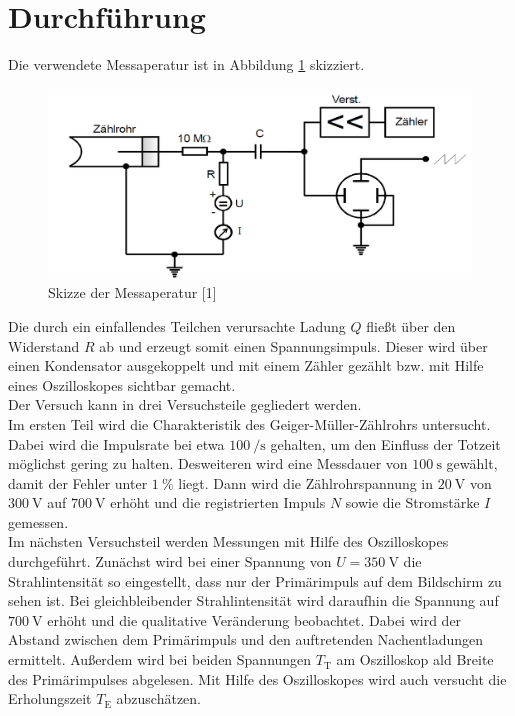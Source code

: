 \section{Durchführung}
\label{sec:Durchführung}

Die verwendete Messaperatur ist in Abbildung \ref{fig:Aufbau} skizziert. 

\begin{figure}
  \centering
  \includegraphics[scale=0.3]{content/Aufbau.png}
  \caption{Skizze der Messaperatur [1]}
  \label{fig:Aufbau}
\end{figure}

Die durch ein einfallendes Teilchen verursachte Ladung $Q$ fließt über den Widerstand $R$
ab und erzeugt somit einen Spannungsimpuls. Dieser wird über einen Kondensator 
ausgekoppelt und mit einem Zähler gezählt bzw. mit Hilfe eines Oszilloskopes sichtbar
gemacht. \\
Der Versuch kann in drei Versuchsteile gegliedert werden. \\

Im ersten Teil wird die Charakteristik des Geiger-Müller-Zählrohrs untersucht. Dabei 
wird die Impulsrate bei etwa $\SI{100}{\per\second}$ gehalten, um den Einfluss der 
Totzeit möglichst gering zu halten. Desweiteren wird eine Messdauer von $\SI{100}{\second}$
gewählt, damit der Fehler unter $\SI{1}{\percent}$ liegt. Dann wird die Zählrohrspannung
in $\SI{20}{\volt}$ von $\SI{300}{\volt}$ auf $\SI{700}{\volt}$ erhöht und die 
registrierten Impuls $N$ sowie die Stromstärke $I$ gemessen. \\

Im nächsten Versuchsteil werden Messungen mit Hilfe des Oszilloskopes durchgeführt. 
Zunächst wird bei einer Spannung von $U = \SI{350}{\volt}$ die Strahlintensität so 
eingestellt, dass nur der Primärimpuls auf dem Bildschirm zu sehen ist. Bei 
gleichbleibender Strahlintensität wird daraufhin die Spannung auf $\SI{700}{\volt}$
erhöht und die qualitative Veränderung beobachtet. Dabei wird der Abstand zwischen
dem Primärimpuls und den auftretenden Nachentladungen ermittelt. Außerdem wird bei 
beiden Spannungen $T_\text{T}$ am Oszilloskop ald Breite des Primärimpulses 
abgelesen. Mit Hilfe des Oszilloskopes wird auch versucht die Erholungszeit $T_\text{E}$
abzuschätzen. \\

